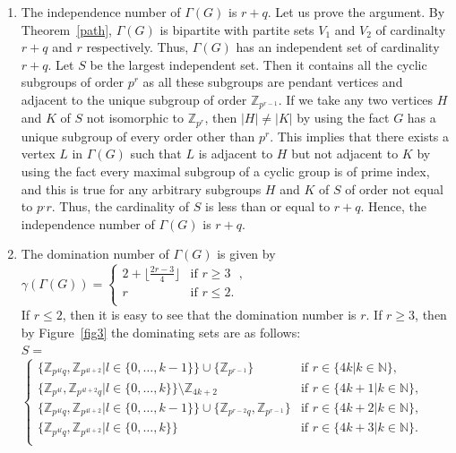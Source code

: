 \documentclass[11pt,twoside]{amsart}
\def \N {{\mathbb{N}}}
\def \Z {{\mathbb{Z}}}
\def \Ga {{\Gamma }}
\begin{document}
\begin{enumerate}[label={(\arabic*)}]
    \item The independence number of $\Ga (G)$ is $r+q$. Let us prove the argument. By Theorem~\ref{path}, $\Ga (G)$ is bipartite with partite sets $V_1$ and $V_2$ of cardinalty $r+q$ and $r$ respectively. Thus, $\Ga (G)$ has an independent set of cardinality $r+q$. Let $S$ be the largest independent set. Then it contains all the cyclic subgroups of order $p^r$ as all these subgroups are pendant vertices and adjacent to the unique subgroup of order $\Z_{p^{r-1}}$. If we take any two vertices $H$ and $K$ of $S$ not isomorphic to $\Z_{p^r}$, then $|H|\not =|K|$ by using the fact $G$ has a unique subgroup of every order other than $p^r$. This implies that there exists a vertex $L$ in $\Ga (G)$ such that $L$ is adjacent to $H$ but not adjacent to $K$ by using the fact every maximal subgroup of a cyclic group is of prime index, and this is true for any arbitrary subgroups $H$ and $K$ of $S$ of order not equal to $p^,r$. Thus, the cardinality of $S$ is less than or equal to $r+q$. Hence, the independence number of $\Ga (G)$ is $r+q$.\\

    \item The domination number of $\Ga (G)$ is given by\\
    $\gamma (\Ga (G)) =\begin{cases}
            2+\lfloor \frac{2r-3}{4} \rfloor & \mbox{if $r\geq 3$ },\\
             r & \mbox{if $r\leq 2$}.\\
              \end{cases}$\\
    If $r\leq 2$, then it is easy to see that the domination number is $r$. If $r\geq 3$, then by Figure~\ref{fig3} the dominating sets are as follows:\\
     $S=$ $\begin{cases}
            \{\Z_{p^{4l}q},\Z_{p^{4l+2}} |l\in \{0,\ldots,k-1\}\}\cup \{\Z_{p^{r-1}}\} & \mbox{if $r\in \{4k|k\in \N\}$},\\
             \{\Z_{p^{4l}}, \Z_{p^{4l+2}q} |l\in \{0,\ldots,k\}\}\setminus\Z_{4k+2} & \mbox{if $r\in \{4k+1|k\in \N\}$},\\
              \{\Z_{p^{4l}q},\Z_{p^{4l+2}} |l\in \{0,\ldots,k-1\}\}\cup \{\Z_{p^{r-2}q}, \Z_{p^{r-1}}\}  & \mbox{if $r\in \{4k+2|k\in \N\}$},\\
               \{\Z_{p^{4l}q},\Z_{p^{4l+2}} |l\in \{0,\ldots,k\}\} & \mbox{if $r\in \{4k+3|k\in \N\}$}.\\
              \end{cases}$\\
    \end{enumerate}
\end{document}
